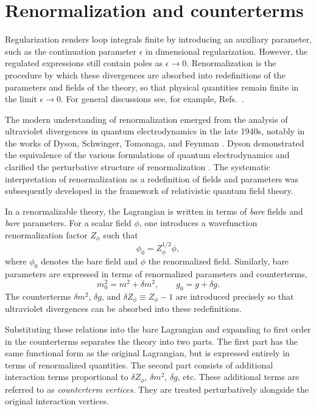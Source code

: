\section*{Renormalization and counterterms}

Regularization renders loop integrals finite by introducing an auxiliary
parameter, such as the continuation parameter $\epsilon$ in dimensional
regularization.
However, the regulated expressions still contain poles as
$\epsilon \to 0$.
Renormalization is the procedure by which these divergences are absorbed
into redefinitions of the parameters and fields of the theory, so that
physical quantities remain finite in the limit
$\epsilon \to 0$.
For general discussions see, for example,
Refs.~\cite{Dyson1949,PeskinSchroeder1995,WeinbergQFT}.

The modern understanding of renormalization emerged from the analysis
of ultraviolet divergences in quantum electrodynamics in the late 1940s,
notably in the works of Dyson, Schwinger, Tomonaga, and Feynman
\cite{Dyson1949,Schwinger1948,Tomonaga1946,Feynman1949}.
Dyson demonstrated the equivalence of the various formulations of quantum
electrodynamics and clarified the perturbative structure of renormalization
\cite{Dyson1949}.
The systematic interpretation of renormalization as a redefinition of
fields and parameters was subsequently developed in the framework of
relativistic quantum field theory.

In a renormalizable theory, the Lagrangian is written in terms of
\emph{bare} fields and \emph{bare} parameters.
For a scalar field $\phi$, one introduces a wavefunction renormalization
factor $Z_\phi$ such that
\begin{equation}
\phi_0 = Z_\phi^{1/2}\phi ,
\end{equation}
where $\phi_0$ denotes the bare field and $\phi$ the renormalized field.
Similarly, bare parameters are expressed in terms of renormalized
parameters and counterterms,
\begin{equation}
m_0^2 = m^2 + \delta m^2,
\qquad
g_0 = g + \delta g .
\end{equation}
The counterterms $\delta m^2$, $\delta g$, and
$\delta Z_\phi \equiv Z_\phi - 1$
are introduced precisely so that ultraviolet divergences can be absorbed
into these redefinitions.

Substituting these relations into the bare Lagrangian and expanding to
first order in the counterterms separates the theory into two parts.
The first part has the same functional form as the original Lagrangian,
but is expressed entirely in terms of renormalized quantities.
The second part consists of additional interaction terms proportional
to $\delta Z_\phi$, $\delta m^2$, $\delta g$, etc.
These additional terms are referred to as \emph{counterterm vertices}.
They are treated perturbatively alongside the original interaction
vertices.

